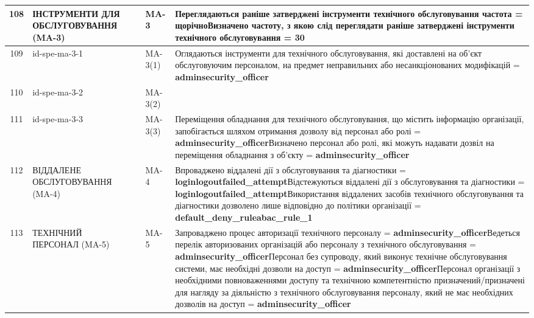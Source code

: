 \documentclass[10pt]{article}
\begin{document}
\begin{longtable}{|c|>{\raggedright\arraybackslash}p{4cm}|>{\raggedright\arraybackslash}p{2.5cm}|>{\raggedright\arraybackslash}p{3.5cm}|>{\raggedright\arraybackslash}p{5.5cm}|}
108 & ІНСТРУМЕНТИ ДЛЯ ОБСЛУГОВУВАННЯ (MA-3) &  & MA-3 & Переглядаються раніше затверджені інструменти технічного обслуговування частота = \textbf{щорічно}\newline Визначено частоту, з якою слід переглядати раніше затверджені інструменти технічного обслуговування = \textbf{30} \\ \hline
109 & id-spe-ma-3-1 &  & MA-3(1) & Оглядаються інструменти для технічного обслуговування, які доставлені на об'єкт обслуговуючим персоналом, на предмет неправильних або несанкціонованих модифікацій = \textbf{adminsecurity\_\allowbreak{}officer} \\ \hline
110 & id-spe-ma-3-2 &  & MA-3(2) &  \\ \hline
111 & id-spe-ma-3-3 &  & MA-3(3) & Переміщення обладнання для технічного обслуговування, що містить інформацію організації, запобігається шляхом отримання дозволу від персонал або ролі = \textbf{adminsecurity\_\allowbreak{}officer}\newline Визначено персонал або ролі, які можуть надавати дозвіл на переміщення обладнання з об'єкту = \textbf{adminsecurity\_\allowbreak{}officer} \\ \hline
112 & ВІДДАЛЕНЕ ОБСЛУГОВУВАННЯ (MA-4) &  & MA-4 & Впроваджено віддалені дії з обслуговування та діагностики = \textbf{loginlogoutfailed\_\allowbreak{}attempt}\newline Відстежуються віддалені дії з обслуговування та діагностики = \textbf{loginlogoutfailed\_\allowbreak{}attempt}\newline Використання віддалених засобів технічного обслуговування та діагностики дозволено лише відповідно до політики організації = \textbf{default\_\allowbreak{}deny\_\allowbreak{}ruleabac\_\allowbreak{}rule\_\allowbreak{}1} \\ \hline
113 & ТЕХНІЧНИЙ ПЕРСОНАЛ (MA-5) &  & MA-5 & Запроваджено процес авторизації технічного персоналу = \textbf{adminsecurity\_\allowbreak{}officer}\newline Ведеться перелік авторизованих організацій або персоналу з технічного обслуговування = \textbf{adminsecurity\_\allowbreak{}officer}\newline Персонал без супроводу, який виконує технічне обслуговування системи, має необхідні дозволи на доступ = \textbf{adminsecurity\_\allowbreak{}officer}\newline Персонал організації з необхідними повноваженнями доступу та технічною компетентністю призначений/призначені для нагляду за діяльністю з технічного обслуговування персоналу, який не має необхідних дозволів на доступ = \textbf{adminsecurity\_\allowbreak{}officer} \\ \hline

\end{longtable}
\end{document}
